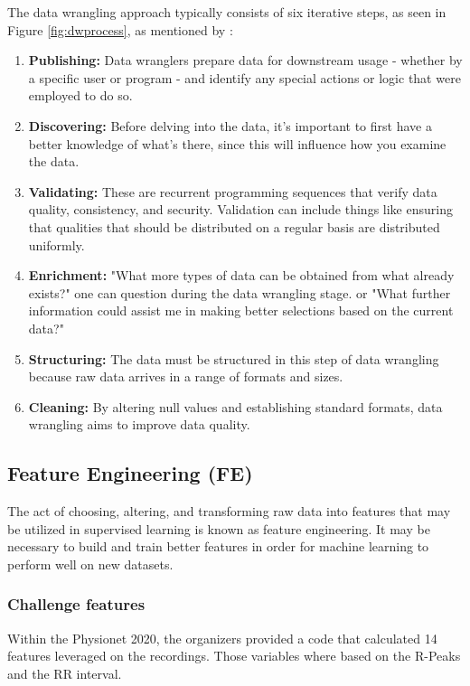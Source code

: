 The data wrangling approach typically consists of six iterative steps, as seen in Figure \ref{fig:dwprocess}, as mentioned by \cite{datawrang2}:

\begin{enumerate}
    \item \textbf{Publishing:} Data wranglers prepare data for downstream usage - whether by a specific user or program - and identify any special actions or logic that were employed to do so. 
    
    \item \textbf{Discovering:} Before delving into the data, it's important to first have a better knowledge of what's there, since this will influence how you examine the data.

    \item \textbf{Validating:} These are recurrent programming sequences that verify data quality, consistency, and security. Validation can include things like ensuring that qualities that should be distributed on a regular basis are distributed uniformly.
    
    \item \textbf{Enrichment:} "What more types of data can be obtained from what already exists?" one can question during the data wrangling stage. or "What further information could assist me in making better selections based on the current data?"
    
    \item \textbf{Structuring:} The data must be structured in this step of data wrangling because raw data arrives in a range of formats and sizes.
    
    \item \textbf{Cleaning:} By altering null values and establishing standard formats, data wrangling aims to improve data quality.
    
\end{enumerate}


\subsection{Feature Engineering (FE)} \label{4fe}

The act of choosing, altering, and transforming raw data into features that may be utilized in supervised learning is known as feature engineering. It may be necessary to build and train better features in order for machine learning to perform well on new datasets.

\subsubsection{Challenge features}
Within the Physionet 2020, the organizers provided a code that calculated 14 features leveraged on the recordings. Those variables where based on the R-Peaks and the RR interval.

